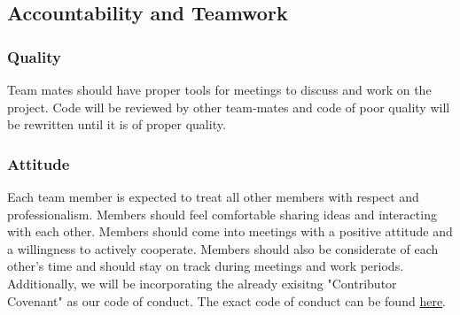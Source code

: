 \documentclass{article}
\begin{document}
\subsection*{Accountability and Teamwork}

\subsubsection*{Quality} 

Team mates should have proper tools for meetings to discuss and work on the project.
Code will be reviewed by other team-mates and code of poor quality will be rewritten  until it is of proper quality.

\subsubsection*{Attitude}


Each team member is expected to treat all other members with respect and professionalism. Members should feel comfortable sharing ideas and interacting with each other. Members should come into meetings with a positive attitude and a willingness to actively cooperate. Members should also be considerate of each other’s time and should stay on track during meetings and work periods.\\

Additionally, we will be incorporating the already exisitng "Contributor Covenant" as our code of conduct. The exact code of conduct can be found \href{https://www.contributor-covenant.org/version/2/1/code_of_conduct/}{here}. \\
\end{document}

